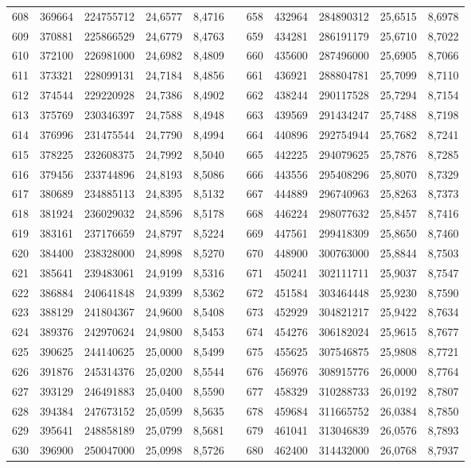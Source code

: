 \begin{longtable}{rrrrrrrrrrr}
608&369664&224755712&24,6577&8,4716&&658&432964&284890312&25,6515&8,6978\\
609&370881&225866529&24,6779&8,4763&&659&434281&286191179&25,6710&8,7022\\
610&372100&226981000&24,6982&8,4809&&660&435600&287496000&25,6905&8,7066\\
611&373321&228099131&24,7184&8,4856&&661&436921&288804781&25,7099&8,7110\\
612&374544&229220928&24,7386&8,4902&&662&438244&290117528&25,7294&8,7154\\
613&375769&230346397&24,7588&8,4948&&663&439569&291434247&25,7488&8,7198\\
614&376996&231475544&24,7790&8,4994&&664&440896&292754944&25,7682&8,7241\\
615&378225&232608375&24,7992&8,5040&&665&442225&294079625&25,7876&8,7285\\
616&379456&233744896&24,8193&8,5086&&666&443556&295408296&25,8070&8,7329\\
617&380689&234885113&24,8395&8,5132&&667&444889&296740963&25,8263&8,7373\\
618&381924&236029032&24,8596&8,5178&&668&446224&298077632&25,8457&8,7416\\
619&383161&237176659&24,8797&8,5224&&669&447561&299418309&25,8650&8,7460\\
620&384400&238328000&24,8998&8,5270&&670&448900&300763000&25,8844&8,7503\\
621&385641&239483061&24,9199&8,5316&&671&450241&302111711&25,9037&8,7547\\
622&386884&240641848&24,9399&8,5362&&672&451584&303464448&25,9230&8,7590\\
623&388129&241804367&24,9600&8,5408&&673&452929&304821217&25,9422&8,7634\\
624&389376&242970624&24,9800&8,5453&&674&454276&306182024&25,9615&8,7677\\
625&390625&244140625&25,0000&8,5499&&675&455625&307546875&25,9808&8,7721\\
626&391876&245314376&25,0200&8,5544&&676&456976&308915776&26,0000&8,7764\\
627&393129&246491883&25,0400&8,5590&&677&458329&310288733&26,0192&8,7807\\
628&394384&247673152&25,0599&8,5635&&678&459684&311665752&26,0384&8,7850\\
629&395641&248858189&25,0799&8,5681&&679&461041&313046839&26,0576&8,7893\\
630&396900&250047000&25,0998&8,5726&&680&462400&314432000&26,0768&8,7937\\

\end{longtable}
